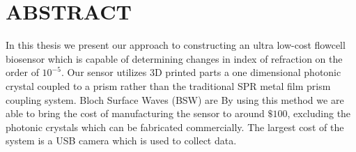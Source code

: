 \section*{ABSTRACT}
\hspace{0.25in}
In this thesis we present our approach to constructing an ultra low-cost flowcell biosensor which is capable of determining changes in index of refraction on the order of $10^{-5}$. Our sensor utilizes 3D printed parts a one dimensional photonic crystal coupled to a prism rather than the traditional SPR metal film prism coupling system. Bloch Surface Waves (BSW) are By using this method we are able to bring the cost of manufacturing the sensor to around $\$100$, excluding the photonic crystals which can be fabricated commercially. The largest cost of the system is a USB camera which is used to collect data.\\